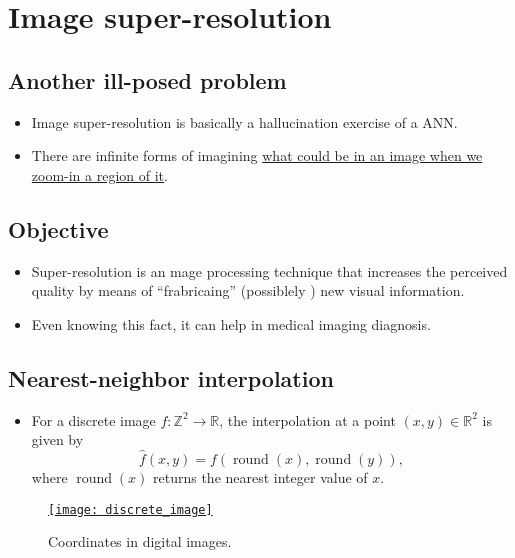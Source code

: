 \chapter{Image super-resolution}

\section{Another ill-posed problem}
\begin{itemize}
\item Image super-resolution is basically a hallucination exercise of
  a \gls{ANN}.
\item There are infinite forms of imagining
  \href{https://en.wikipedia.org/wiki/Super-resolution_imaging}{what
    could be in an image when we zoom-in a region of it}.
\end{itemize}

\section{Objective}
\begin{itemize}
\item Super-resolution is an mage processing technique that
  increases the perceived quality by means of ``frabricaing''
  (possiblely ) new visual information.
\item Even knowing this fact, it can help in medical imaging
  diagnosis.
\end{itemize}

\section{Nearest-neighbor interpolation \cite{gonzalez2009digital}}
\begin{itemize}
\item For a discrete image $f: \mathbb{Z}^2 \to \mathbb{R}$, the interpolation at a point 
$(x,y) \in \mathbb{R}^2$ is given by
\begin{equation}
\hat{f}(x,y) = f\!\left( \operatorname{round}(x), \operatorname{round}(y) \right),
\end{equation}
where $\operatorname{round}(x)$ returns the nearest integer value of $x$.
\end{itemize}

\begin{figure}[H]
  \vspace{-2ex}
  \centering
  \href{https://www.mrecacademics.com/DepartmentStudyMaterials/20201220-Digital%20Image%20Processing%20Notes.pdf}{\texttt{[image: discrete\_image]}}
  \caption{Coordinates in digital images.}
  \label{fig:digital_image}
\end{figure}

